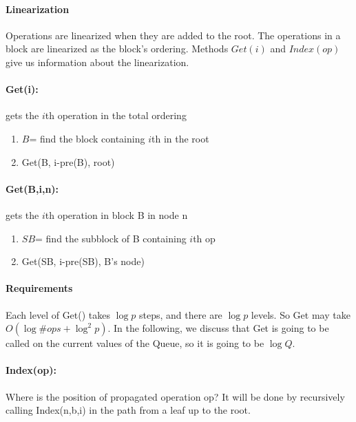 \documentclass[12pt]{article}
\begin{document}
\paragraph{Linearization}
Operations are linearized when they are added to the root. The operations in a block are linearized as the block's ordering. Methods $Get(i)$ and $Index(op)$ give us information about the linearization.

\paragraph{Get(i):} gets the $i$th operation in the total ordering
\begin{enumerate}
  \item $B$= find the block containing $i$th in the root 
  \item Get(B, i-pre(B), root) 
\end{enumerate}

\paragraph{Get(B,i,n):} gets the $i$th operation in block B in node n
\begin{enumerate}
  \item $SB$= find the subblock of B containing $i$th op
  \item Get(SB, i-pre(SB), B's node)
\end{enumerate}

\paragraph{Requirements} Each level of Get() takes $\log p$ steps, and there are $\log p$ levels. So Get may take $O(\log \#ops + \log^2 p)$. In the following, we discuss that Get is going to be called on the current values of the Queue, so it is going to be $\log Q$.

\paragraph{Index(op):} Where is the position of propagated operation op? It will be done by recursively calling Index(n,b,i) in the path from a leaf up to the root.
\end{document}
